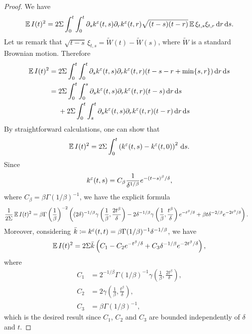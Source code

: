 \documentclass[10pt]{article}
\begin{document}
\begin{proof} We have
	\begin{equation}
		\operatorname{\mathbb{E}} I(t)^2 = 2 \Sigma \int_0^t \int_0^t \partial_s k^\varepsilon(t, s) \partial_r k^\varepsilon(t, r) \sqrt{(t- s)(t-r)} \operatorname{\mathbb{E}} \xi_{t,s}\xi_{t,r} \,\mathrm{d} r \,\mathrm{d} s.
	\end{equation}
	Let us remark that $\sqrt{t-s}\, \xi_{t,s} = \widetilde W(t) - \widetilde W(s)$, where $\widetilde W$ is a standard Brownian motion. Therefore 
	\begin{equation}
	\begin{aligned}
		\operatorname{\mathbb{E}} I(t)^2 &= 2\Sigma \int_0^t \int_0^t \partial_s k^\varepsilon(t, s) \partial_r k^\varepsilon(t, r) (t-s-r+\min\{s,r\}) \,\mathrm{d} r \,\mathrm{d} s \\
		&= 
		\begin{aligned}[t]
		& 2\Sigma \int_0^t \int_0^s \partial_s k^\varepsilon(t, s) \partial_r k^\varepsilon(t, r) (t-s) \,\mathrm{d} r \,\mathrm{d} s \\
		&+ 2\Sigma \int_0^t \int_s^t \partial_s k^\varepsilon(t, s) \partial_r k^\varepsilon(t, r) (t-r) \,\mathrm{d} r \,\mathrm{d} s 
		\end{aligned}
	\end{aligned}
	\end{equation}
	By straightforward calculations, one can show that
	\begin{equation}
		\operatorname{\mathbb{E}} I(t)^2 = 2\Sigma \int_0^t \left(k^\varepsilon(t,s) - k^\varepsilon(t,0)\right)^2 \,\mathrm{d} s.
	\end{equation}
	Since
	\begin{equation}
		k^\varepsilon(t, s) = C_\beta\frac1{\delta^{1/\beta}} e^{-(t-s)^\beta / \delta},
	\end{equation}
	where $C_\beta = \beta \Gamma(1/\beta)^{-1}$, we have the explicit formula
	\begin{equation}
	\begin{aligned}
		\frac1{2\Sigma }\operatorname{\mathbb{E}} I(t)^2 &= \beta\Gamma\left(\frac1\beta\right)^{-2} \left((2\delta)^{-1/\beta}\gamma\left(\frac1\beta, \frac{2t^\beta}{\delta}\right) -2 \delta^{-1/\beta}\gamma\left(\frac1\beta, \frac{t^\beta}{\delta}\right)e^{-t^\beta/\delta} + \beta t \delta^{-2/\beta} e^{-2t^\beta/\delta}\right).
	\end{aligned}
	\end{equation}
	Moreover, considering $\bar k \coloneqq k^\varepsilon(t, t) = \beta \Gamma(1/\beta)^{-1}\delta^{-1/\beta}$, we have
	\begin{equation}
		\operatorname{\mathbb{E}} I(t)^2 = 2 \Sigma \bar k  \left( C_1 - C_2 e^{-t^\beta/\delta} + C_3 \delta^{-1/\beta} e^{-2t^\beta/\delta}\right),
	\end{equation}
	where 
	\begin{equation}\label{eq:LemmaDiffusionConstants}
	\begin{aligned}
		C_1 &= 2^{-1/\beta} \Gamma(1/\beta)^{-1} \gamma\left(\frac1\beta, \frac{2t^\beta}{\delta}\right), \\
		C_2 &= 2 \gamma\left(\frac1\beta, \frac{t^\beta}{\delta}\right),\\
		C_3 &= \beta \Gamma(1/\beta)^{-1},
	\end{aligned}
	\end{equation}
	which is the desired result since $C_1$, $C_2$ and $C_3$ are bounded independently of $\delta$ and $t$.
\end{proof}
\end{document}
